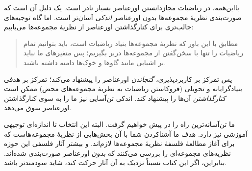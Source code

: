 \documentclass[../../../include/open-logic-section]{subfiles}
\begin{document}
بااین‌همه، در ریاضیات مجازدانستن اورعناصر بسیار نادر است. یک دلیل آن است
که صورت‌بندی نظریهٔ مجموعه‌ها بدون اورعناصر \emph{اندکی} آسان‌تر است. اما
گاه توجیه‌های جالب‌تری برای کنارگذاشتن اورعناصر از نظریهٔ مجموعه‌ها می‌یابیم:
\begin{quote}
	مطابق با این باور که نظریهٔ مجموعه‌ها بنیاد ریاضیات است، باید بتوانیم
	تمام ریاضیات را تنها با سخن‌گفتن از مجموعه‌ها دربر بگیریم؛ پس متغیرهای
	ما نباید بر اشیایی مانند گاوها و خوک‌ها دامنه داشته باشند.
	\citep[p.~8]{Kunen1980}
\end{quote}
پس تمرکز بر کاربردپذیری، \emph{گنجاندن} اورعناصر را پیشنهاد می‌کند؛ تمرکز
بر هدفی بنیادگرایانه و تحویلی (فروکاستن ریاضیات به نظریهٔ مجموعه‌های محض)
ممکن است \emph{کنارگذاشتن} آن‌ها را پیشنهاد کند. اندکی تن‌آسایی نیز ما را
به سوی کنارگذاشتن اورعناصر سوق می‌دهد.

ما تن‌آسانه‌ترین راه را در پیش خواهیم گرفت. البته این انتخاب تا اندازه‌ای
توجیهی آموزشی نیز دارد. هدف ما آشناکردن شما با آن بخش‌هایی از نظریهٔ
مجموعه‌هاست که برای آغاز مطالعهٔ فلسفهٔ نظریهٔ مجموعه‌ها لازم‌اند. و بیشتر
آثار فلسفی این حوزه نظریه‌های مجموعه‌ای را بررسی می‌کنند که \emph{بدون}
اورعناصر صورت‌بندی شده‌اند. بنابراین، اگر این کتاب نسبتاً نزدیک به آن آثار
حرکت کند، شاید سودمندتر باشد.
\end{document}
